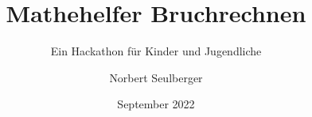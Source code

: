 \documentclass[12p,numbers=noendperiod,DIV=15]{scrartcl}
\begin{document}
	
\title{Mathehelfer Bruchrechnen}
\subtitle{Ein Hackathon für Kinder und Jugendliche}
\author{Norbert Seulberger}
\date{September 2022}

\maketitle

\tableofcontents






%
%


%









\end{document}
